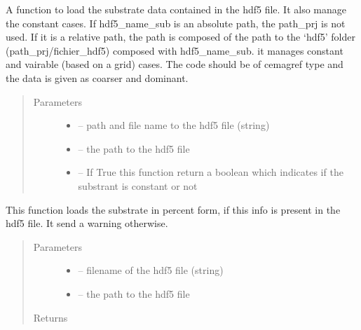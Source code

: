 \documentclass[letterpaper,10pt,english]{sphinxmanual}
\begin{document}
\begin{fulllineitems}
\label{\detokenize{index:src.load_hdf5.load_hdf5_sub}}
A function to load the substrate data contained in the hdf5 file. It also manage
the constant cases. If hdf5\_name\_sub is an absolute path, the path\_prj is not used. If it is a relative path,
the path is composed of the path to the `hdf5' folder (path\_prj/fichier\_hdf5) composed with hdf5\_name\_sub. it manages constant and
vairable (based on a grid) cases. The code should be of cemagref type and the data is given as coarser and dominant.
\begin{quote}\begin{description}
\item[{Parameters}] \leavevmode\begin{itemize}
\item {} 
 -- path and file name to the hdf5 file (string)

\item {} 
 -- the path to the hdf5 file

\item {} 
 -- If True this function return a boolean which indicates if the substrant is constant or not

\end{itemize}

\end{description}\end{quote}

\end{fulllineitems}


\begin{fulllineitems}
\label{\detokenize{index:src.load_hdf5.load_sub_percent}}
This function loads the substrate in percent form, if this info is present in the hdf5 file. It send a warning
otherwise.
\begin{quote}\begin{description}
\item[{Parameters}] \leavevmode\begin{itemize}
\item {} 
 -- filename of the hdf5 file (string)

\item {} 
 -- the path to the hdf5 file

\end{itemize}

\item[{Returns}] \leavevmode


\end{description}\end{quote}

\end{fulllineitems}
\end{document}
